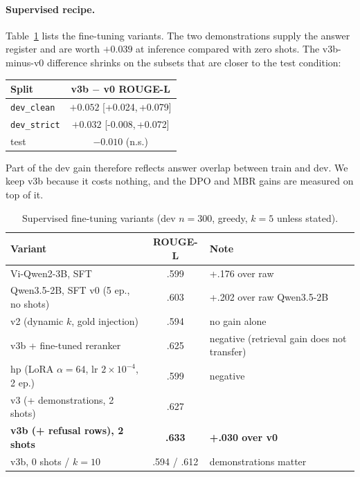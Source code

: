 \documentclass[11pt,a4paper]{article}
\newcommand{\rl}{ROUGE-L}
\newcommand{\ci}[2]{{\scriptsize[#1,\,#2]}}
\newcommand{\best}[1]{\textbf{#1}}
\begin{document}
\paragraph{Supervised recipe.}
Table~\ref{tab:sft} lists the fine-tuning variants. The two demonstrations supply the answer register and are worth $+0.039$ at inference compared with zero shots. The v3b-minus-v0 difference shrinks on the subsets that are closer to the test condition:

\begin{center}
\small
\begin{tabular}{@{}lc@{}}
\toprule
Split & v3b $-$ v0 \rl{}\\
\midrule
\texttt{dev\_clean} & $+0.052$ \ci{+0.024}{+0.079}\\
\texttt{dev\_strict} & $+0.032$ \ci{-0.008}{+0.072}\\
test & $-0.010$ (n.s.)\\
\bottomrule
\end{tabular}
\end{center}

\noindent Part of the dev gain therefore reflects answer overlap between train and dev. We keep v3b because it costs nothing, and the DPO and MBR gains are measured on top of it.
\begin{table}[H]
\centering
\caption{Supervised fine-tuning variants (dev $n{=}300$, greedy, $k{=}5$ unless stated).}\label{tab:sft}
\begin{tabular}{@{}lcl@{}}
\toprule
Variant & \rl{} & Note\\
\midrule
Vi-Qwen2-3B, SFT & .599 & +.176 over raw\\
Qwen3.5-2B, SFT v0 (5 ep., no shots) & .603 & +.202 over raw Qwen3.5-2B\\
v2 (dynamic $k$, gold injection) & .594 & no gain alone\\
v3b + fine-tuned reranker & .625 & negative (retrieval gain does not transfer)\\
hp (LoRA $\alpha{=}64$, lr $2\!\times\!10^{-4}$, 2 ep.) & .599 & negative\\
v3 (+ demonstrations, 2 shots) & .627 & \\
\best{v3b (+ refusal rows), 2 shots} & \best{.633} & \best{+.030 over v0}\\
v3b, 0 shots / $k{=}10$ & .594 / .612 & demonstrations matter\\
\bottomrule
\end{tabular}
\end{table}
\end{document}
